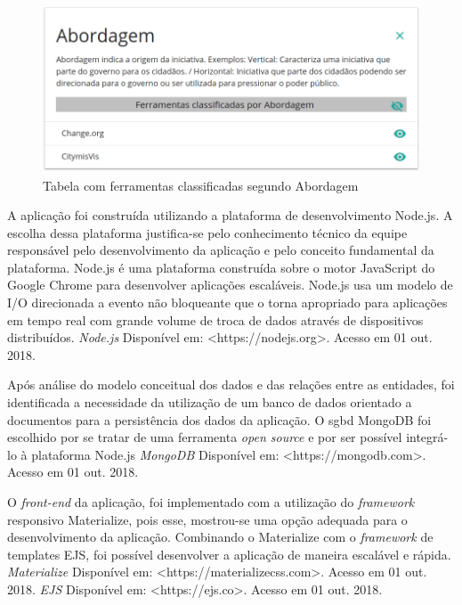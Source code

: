 \begin{figure}[!ht]
    \centering
    \includegraphics[scale=0.20]{./figuras/abordagem.png}
    \caption{Tabela com ferramentas classificadas segundo Abordagem}
    \label{fig:tabela-ferramentas}
\end{figure}
\par

A aplicação foi construída utilizando a plataforma de desenvolvimento Node.js. A escolha dessa plataforma justifica-se pelo conhecimento técnico da equipe responsável pelo desenvolvimento da aplicação e pelo conceito fundamental da plataforma. Node.js é uma plataforma construída sobre o motor JavaScript do Google Chrome para desenvolver aplicações escaláveis. Node.js usa um modelo de I/O direcionada a evento não bloqueante que o torna
apropriado para aplicações em tempo real com grande volume de troca de dados através de dispositivos distribuídos. 
\textit{Node.js} Disponível em: <https://nodejs.org>. Acesso em 01 out. 2018.

\par
Após análise do modelo conceitual dos dados e das relações entre as entidades, foi identificada a necessidade da utilização de um banco de dados orientado a documentos para a persistência dos dados da aplicação. 
O \acrfull{sgbd} MongoDB foi escolhido por se tratar de uma ferramenta \textit{open source} e por ser possível integrá-lo à plataforma Node.js 
\textit{MongoDB} Disponível em: <https://mongodb.com>. Acesso em 01 out. 2018.

\par
O \textit{front-end} da aplicação, foi implementado com a utilização do \textit{framework} responsivo Materialize, pois esse, 
mostrou-se uma opção adequada para o desenvolvimento da aplicação. Combinando o Materialize com o \textit{framework} de templates EJS, 
foi possível desenvolver a aplicação de maneira escalável e rápida. \textit{Materialize} Disponível em: <https://materializecss.com>. Acesso em 01 out. 2018.
\textit{EJS} Disponível em: <https://ejs.co>. Acesso em 01 out. 2018.

